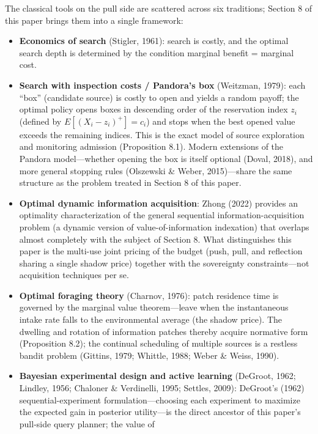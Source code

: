 \documentclass[
  11pt]{article}
\providecommand{\tightlist}{%
  \setlength{\itemsep}{0pt}\setlength{\parskip}{0pt}}
\begin{document}
The classical tools on the pull side are scattered across six
traditions; Section 8 of this paper brings them into a single framework:

\begin{itemize}
\tightlist
\item
  \textbf{Economics of search} (Stigler, 1961): search is costly, and
  the optimal search depth is determined by the condition marginal
  benefit = marginal cost.
\item
  \textbf{Search with inspection costs / Pandora's box} (Weitzman,
  1979): each ``box'' (candidate source) is costly to open and yields a
  random payoff; the optimal policy opens boxes in descending order of
  the reservation index \(z_i\) (defined by \(E[(X_i - z_i)^+] = c_i\))
  and stops when the best opened value exceeds the remaining indices.
  This is the exact model of source exploration and monitoring admission
  (Proposition 8.1). Modern extensions of the Pandora model---whether
  opening the box is itself optional (Doval, 2018), and more general
  stopping rules (Olszewski \& Weber, 2015)---share the same structure
  as the problem treated in Section 8 of this paper.
\item
  \textbf{Optimal dynamic information acquisition}: Zhong (2022)
  provides an optimality characterization of the general sequential
  information-acquisition problem (a dynamic version of
  value-of-information indexation) that overlaps almost completely with
  the subject of Section 8. What distinguishes this paper is the
  multi-use joint pricing of the budget (push, pull, and reflection
  sharing a single shadow price) together with the sovereignty
  constraints---not acquisition techniques per se.
\item
  \textbf{Optimal foraging theory} (Charnov, 1976): patch residence time
  is governed by the marginal value theorem---leave when the
  instantaneous intake rate falls to the environmental average (the
  shadow price). The dwelling and rotation of information patches
  thereby acquire normative form (Proposition 8.2); the continual
  scheduling of multiple sources is a restless bandit problem (Gittins,
  1979; Whittle, 1988; Weber \& Weiss, 1990).
\item
  \textbf{Bayesian experimental design and active learning} (DeGroot,
  1962; Lindley, 1956; Chaloner \& Verdinelli, 1995; Settles, 2009):
  DeGroot's (1962) sequential-experiment formulation---choosing each
  experiment to maximize the expected gain in posterior utility---is the
  direct ancestor of this paper's pull-side query planner; the value of

\end{itemize}
\end{document}
